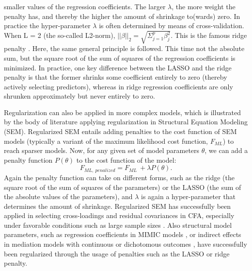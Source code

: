 \documentclass[]{interact}
\theoremstyle{plain}%
\theoremstyle{definition}
\theoremstyle{remark}
\begin{document}
smaller values of the regression coefficients. The larger \(\lambda\),
the more weight the penalty has, and thereby the higher the amount of
shrinkage to(wards) zero. In practice the hyper-parameter \(\lambda\) is
often determined by means of cross-validation. When L = 2 (the so-called
L2-norm), \(||\beta||_2 = \sqrt{\Sigma_{j=1}^p \beta_j^2}\). This is the
famous ridge penalty \citep{hoerl_ridge_2000}. Here, the same general
principle is followed. This time not the absolute sum, but the square
root of the sum of squares of the regression coefficients is minimized.
In practice, one key difference between the LASSO and the ridge penalty
is that the former shrinks some coefficient entirely to zero (thereby
actively selecting predictors), whereas in ridge regression coefficients
are only shrunken approximately but never entirely to zero.

Regularization can also be applied in more complex models, which is
illustrated by the body of literature applying regularization in
Structural Equation Modeling (SEM). Regularized SEM entails adding
penalties to the cost function of SEM models (typically a variant of the
maximum likelihood cost function, \(F_{ML}\)) to reach sparser models.
Now, for any given set of model parameters \(\theta\), we can add a
penalty function \(P(\theta)\) to the cost function of the model:
\[F_{ML, \ penalized} = F_{ML} \ + \lambda P(\theta).\] Again the
penalty function can take on different forms, such as the ridge (the
square root of the sum of squares of the parameters) or the LASSO (the
sum of the absolute values of the parameters), and \(\lambda\) is again
a hyper-parameter that determines the amount of shrinkage. Regularized
SEM has successfully been applied in selecting cross-loadings and
residual covariances in CFA, especially under favorable conditions such
as large sample sizes \citep{jacobucci_regularized_2016}. Also
structural model parameters, such as regression coefficients in MIMIC
models \citep{jacobucci_regularized_2016, jacobucci_practical_2019}, or
indirect effects in mediation models with continuous
\citep{serang_exploratory_2017} or dichotomous outcomes
\citep{serang_exploratory_2020}, have successfully been regularized
through the usage of penalties such as the LASSO or ridge penalty.
\end{document}
